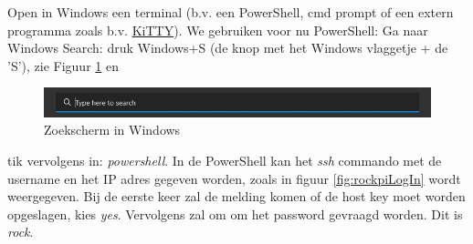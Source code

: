 Open in Windows een terminal (b.v. een PowerShell, cmd prompt of een extern programma zoals b.v. \href{https://www.fosshub.com/KiTTY.html}{KiTTY}). We gebruiken voor nu PowerShell: Ga naar Windows Search: druk Windows+S (de knop met het Windows vlaggetje + de 'S'), zie Figuur \ref{fig:windowsZk} en
\begin{figure}[h!]
	\centering
	\begin{center} 	
			\includegraphics[width=1\textwidth]{figuren/windowsPowerShellSearch}
			\caption{Zoekscherm in Windows}
			\label{fig:windowsZk}

	\end{center}
\end{figure}
tik vervolgens in: \textit{powershell}. In de PowerShell kan het \textit{ssh} commando met de username en het IP adres gegeven worden, zoals in figuur \ref{fig:rockpiLogIn} wordt weergegeven. Bij de eerste keer zal de melding komen of de host key moet worden opgeslagen, kies \textit{yes}. Vervolgens zal om om het password gevraagd worden. Dit is \textit{rock}. 

